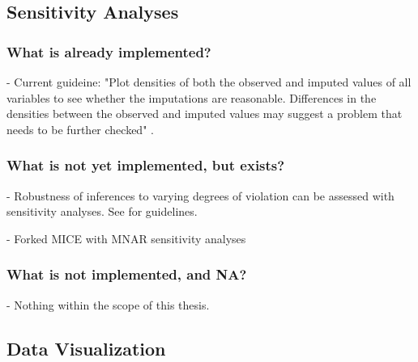 \documentclass[article]{jss}
\begin{document}
\subsection{Sensitivity Analyses} \label{sec:sensitivity}


\subsubsection{What is already implemented?}

- Current guideine: "Plot densities of both the observed and imputed values of all variables to see whether the imputations are reasonable. Differences in the densities between the observed and imputed values may suggest a problem that needs to be further checked" \cite[p.~43]{mice}. 

\subsubsection{What is not yet implemented, but exists?}

- Robustness of inferences to varying degrees of violation can be assessed with sensitivity analyses. See \citep{nguy17} for guidelines. 

- Forked MICE with MNAR sensitivity analyses

\subsubsection{What is not implemented, and NA?}

- Nothing within the scope of this thesis.


\subsection{Data Visualization} \label{sec:visualization}

\end{document}
